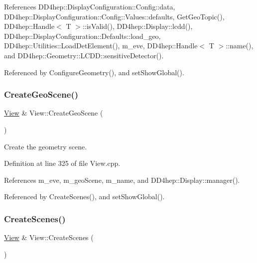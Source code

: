References D\+D4hep\+::\+Display\+Configuration\+::\+Config\+::data, D\+D4hep\+::\+Display\+Configuration\+::\+Config\+::\+Values\+::defaults, Get\+Geo\+Topic(), D\+D4hep\+::\+Handle$<$ T $>$\+::is\+Valid(), D\+D4hep\+::\+Display\+::lcdd(), D\+D4hep\+::\+Display\+Configuration\+::\+Defaults\+::load\+\_\+geo, D\+D4hep\+::\+Utilities\+::\+Load\+Det\+Element(), m\+\_\+eve, D\+D4hep\+::\+Handle$<$ T $>$\+::name(), and D\+D4hep\+::\+Geometry\+::\+L\+C\+D\+D\+::sensitive\+Detector().



Referenced by Configure\+Geometry(), and set\+Show\+Global().

\hypertarget{class_d_d4hep_1_1_view_a8738a88e61d962553fe86472b294028b}{}\label{class_d_d4hep_1_1_view_a8738a88e61d962553fe86472b294028b} 
\subsubsection{\texorpdfstring{Create\+Geo\+Scene()}{CreateGeoScene()}}
{\footnotesize\ttfamily \hyperlink{class_d_d4hep_1_1_view}{View} \& View\+::\+Create\+Geo\+Scene (\begin{DoxyParamCaption}{ }\end{DoxyParamCaption})\hspace{0.3cm}{\ttfamily [virtual]}}



Create the geometry scene. 



Definition at line 325 of file View.\+cpp.



References m\+\_\+eve, m\+\_\+geo\+Scene, m\+\_\+name, and D\+D4hep\+::\+Display\+::manager().



Referenced by Create\+Scenes(), and set\+Show\+Global().

\hypertarget{class_d_d4hep_1_1_view_a6c2c1c89a0ad7c6a75379103f8523fdc}{}\label{class_d_d4hep_1_1_view_a6c2c1c89a0ad7c6a75379103f8523fdc} 
\subsubsection{\texorpdfstring{Create\+Scenes()}{CreateScenes()}}
{\footnotesize\ttfamily \hyperlink{class_d_d4hep_1_1_view}{View} \& View\+::\+Create\+Scenes (\begin{DoxyParamCaption}{ }\end{DoxyParamCaption})\hspace{0.3cm}{\ttfamily [virtual]}}



